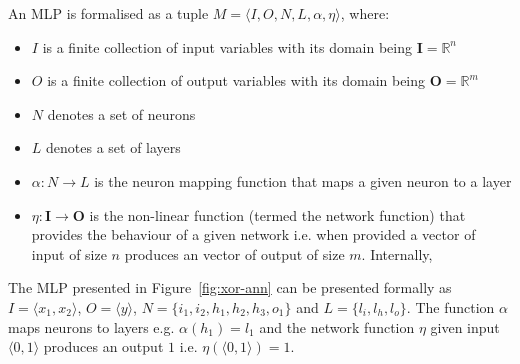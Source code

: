 \begin{definition}
	\label{def:bb-mlp}
	An \ac{MLP} is formalised as a tuple $M = \langle I, O, N, L,
	\alpha, \eta  \rangle$, where:
	\begin{itemize}
		\item $I$ is a finite collection of input variables with
		its domain being $\mathbf{I} = \mathbb{R}^n$
		\item  $O$ is a finite collection of  output variables with
		its domain being $\mathbf{O} = \mathbb{R}^m$
		\item  $N$ denotes a set of neurons
		\item $L$ denotes a set of layers
		\item $\alpha: N \rightarrow L$ is the neuron mapping function
		that maps a given neuron to a layer
		\item $\eta: \mathbf{I} \rightarrow \mathbf{O}$ is the non-linear
		function (termed the network function) that provides the behaviour of a given network i.e.
		when provided a vector of input of size $n$ produces an
		vector of output of size $m$. Internally, 
	\end{itemize}
\end{definition} 

\begin{example}
	The \ac{MLP} presented in Figure~\ref{fig:xor-ann} can be presented formally as $I=\langle x_1, x_2 \rangle$, $O = \langle y \rangle$, $N= \{i_1, i_2, h_1, h_2, h_3, o_1\}$ and $L
	= \{l_i, l_h, l_o\}$. The function $\alpha$ maps neurons to
	layers e.g. $\alpha(h_1) = l_1$ and the network function $\eta$
	given input $\langle 0, 1 \rangle$ produces an output $1$
	i.e. $\eta(\langle 0, 1 \rangle) = 1$.
	
\end{example}

